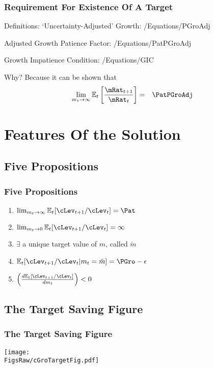 \documentclass[pdflatex]{beamer}\providecommand{\texname}{BufferStockTheory-Slides}%
\providecommand{\EqDir}{\econtexRoot/Equations}
\providecommand{\FigsRaw}{\econtexRoot/Code/Python/Figures}
\providecommand{\Ex}{\mathbb{E}}
\begin{document}
\begin{frame}
\frametitle{Requirement For Existence Of A Target}

Definitions: `Uncertainty-Adjusted' Growth:
 \EqDir/PGroAdj

Adjusted Growth Patience Factor:
 \EqDir/PatPGroAdj

Growth Impatience Condition:
 \EqDir/GIC~



Why?  Because it can be shown that
\begin{eqnarray}
 \lim_{m_{t} \rightarrow \infty} \Ex_{t}\left[\frac{\mRat_{t+1}}{\mRat_{t}}\right] & = & \PatPGroAdj  \label{eq:mGrowth}
\end{eqnarray}

\end{frame}

\section{Features Of the Solution}
\subsection{Five Propositions}
\begin{frame}
\frametitle{Five Propositions}

\begin{enumerate}
\item $\lim_{m_{t} \rightarrow \infty} \Ex_{t}[\cLev_{t+1}/\cLev_{t}] = \Pat$
\item $\lim_{m_{t} \rightarrow 0} \Ex_{t}[\cLev_{t+1}/\cLev_{t}] = \infty$
\item $\exists$ a unique target value of $m$, called $\check{m}$
\item $\Ex_{t}[\cLev_{t+1}/\cLev_{t} | m_{t} = \check{m}] = \PGro - \epsilon$
\item $\left(\frac{d \Ex_{t}[\cLev_{t+1}/\cLev_{t}]}{d m_{t}}\right) < 0$
\end{enumerate}

\end{frame}

\subsection{The Target Saving Figure}
\begin{frame}
\frametitle{The Target Saving Figure}
\centerline{\texttt{[image: \\FigsRaw/cGroTargetFig.pdf]}}
\end{frame}
\end{document}
